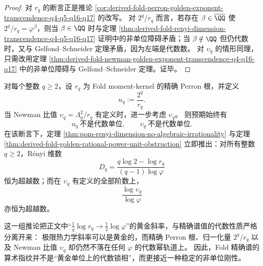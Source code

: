 \begin{proof}
对 \(r_q\) 的断言正是推论
\ref{cor:derived-fold-perron-golden-exponent-transcendence-q4-q5-q16-q17}
的改写。
对 \(2^q/r_q\) 而言，若存在 \(\beta\in\overline{\QQ}\) 使
\(
2^q/r_q=\varphi^\beta
\)，则当 \(\beta\in\QQ\) 时与定理
\ref{thm:derived-fold-renyi-dimension-transcendence-q4-q5-q16-q17}
证明中的非单位障碍矛盾；当 \(\beta\notin\QQ\) 但仍代数时，又与 Gelfond--Schneider 定理矛盾，因为左端是代数数。
对 \(\upsilon_q\) 的情形同理，只需改用定理
\ref{thm:derived-fold-newman-golden-exponent-transcendence-q4-q16-q17}
中的非单位障碍与 Gelfond--Schneider 定理。证毕。
\end{proof}

\begin{conjecture}[全阶非单位刚性与全谱超越性]\label{conj:derived-fold-nonunit-rigidity-full-spectrum}
对每个整数 \(q\ge 2\)，设 \(r_q\) 为 Fold moment-kernel 的精确 Perron 根，并定义
\[
u_q:=\frac{2^q}{r_q}.
\]
当 Newman 比值 \(\upsilon_q=\Lambda_q^2/r_q\) 有定义时，进一步考虑 \(\upsilon_q\)。
则预期始终有
\[
u_q\ \text{不是代数单位},
\qquad
\upsilon_q\ \text{不是代数单位}.
\]
在该断言下，定理 \ref{thm:pom-renyi-dimension-no-algebraic-irrationality} 与定理
\ref{thm:derived-fold-golden-rational-power-unit-obstruction}
立即推出：对所有整数 \(q\ge 2\)，Rényi 维数
\[
D_q=\frac{q\log 2-\log r_q}{(q-1)\log\varphi}
\]
恒为超越数；而在 \(\upsilon_q\) 有定义的全部阶数上，
\[
\frac{\log \upsilon_q}{\log\varphi}
\]
亦恒为超越数。
\end{conjecture}

\begin{remark}\label{rem:derived-fold-golden-slope-vs-nonkummer-exactness}
这一组推论把正文中“\(\frac1q\log r_q\to \frac12\log\varphi\)”的黄金斜率，与精确谱值的代数性质严格分离开来：
极限热力学斜率可以是黄金的，而精确 Perron 根、归一化量 \(2^q/r_q\) 以及 Newman 比值 \(\upsilon_q\) 却仍然不落在任何 \(\varphi\) 的代数幂轨道上。
因此，Fold 精确谱的算术指纹并不是“黄金单位上的代数锁相”，而更接近一种稳定的非单位刚性。
\end{remark}

\endinput
